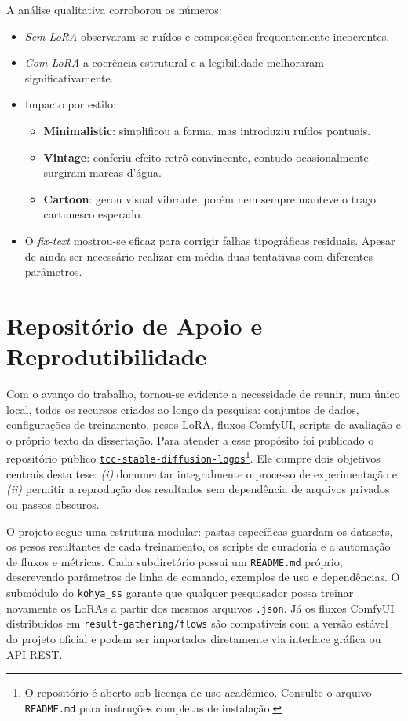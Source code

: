 \documentclass[12pt, %
openright, 
oneside, %
a4paper,    %
brazil]{facom-ufu-abntex2}
\begin{document}
A análise qualitativa corroborou os números:

\begin{itemize}
    \item \emph{Sem LoRA} observaram-se ruídos e composições frequentemente incoerentes.
    \item \emph{Com LoRA} a coerência estrutural e a legibilidade melhoraram significativamente.
    \item Impacto por estilo:
    \begin{itemize}
        \item \textbf{Minimalistic}: simplificou a forma, mas introduziu ruídos pontuais.
        \item \textbf{Vintage}: conferiu efeito retrô convincente, contudo ocasionalmente surgiram marcas-d'água.
        \item \textbf{Cartoon}: gerou visual vibrante, porém nem sempre manteve o traço cartunesco esperado.
    \end{itemize}
    \item O \emph{fix-text} mostrou-se eficaz para corrigir falhas tipográficas residuais. Apesar de ainda ser necessário realizar em média duas tentativas com diferentes parâmetros.
\end{itemize}

\section{Repositório de Apoio e Reprodutibilidade} \label{repo}

Com o avanço do trabalho, tornou-se evidente a necessidade de reunir, num único local, todos os recursos criados ao longo da pesquisa: conjuntos de dados, configurações de treinamento, pesos LoRA, fluxos ComfyUI, scripts de avaliação e o próprio texto da dissertação. Para atender a esse propósito foi publicado o repositório público \href{https://github.com/tornellihenrique/tcc-stable-diffusion-logos}{\texttt{tcc-stable-diffusion-logos}}\footnote{O repositório é aberto sob licença de uso acadêmico. Consulte o arquivo \texttt{README.md} para instruções completas de instalação.}. Ele cumpre dois objetivos centrais desta tese: \emph{(i)} documentar integralmente o processo de experimentação e \emph{(ii)} permitir a reprodução dos resultados sem dependência de arquivos privados ou passos obscuros.

O projeto segue uma estrutura modular: pastas específicas guardam os datasets, os pesos resultantes de cada treinamento, os scripts de curadoria e a automação de fluxos e métricas. Cada subdiretório possui um \texttt{README.md} próprio, descrevendo parâmetros de linha de comando, exemplos de uso e dependências. O submódulo do \texttt{kohya\_ss} garante que qualquer pesquisador possa treinar novamente os LoRAs a partir dos mesmos arquivos \texttt{.json}. Já os fluxos ComfyUI distribuídos em \texttt{result-gathering/flows} são compatíveis com a versão estável do projeto oficial e podem ser importados diretamente via interface gráfica ou API REST.
\end{document}
